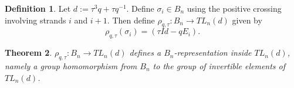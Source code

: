 \documentclass{amsart}
\newcommand{\hackcenter}[1]{
 \xy (0,0)*{#1}; \endxy}
\theoremstyle{plain}
\newtheorem{theorem}{Theorem}
\theoremstyle{definition}
\newtheorem{definition}[theorem]{Definition}
\theoremstyle{definition}
\numberwithin{equation}{section}
\numberwithin{theorem}{section}
\renewcommand{\to}{\rightarrow}
\numberwithin{equation}{section}
\def\ME#1{\textcolor[rgb]{0.40,0.00,0.90}{[ME: #1]}}%
\begin{document}

\begin{definition}
  Let $d:=\tau^3 q+\tau q^{-1}$. Define $\sigma_i\in B_n$ using the positive crossing involving strands $i$ and $i+1$.
  Then define $\rho_{q,\tau}:B_n \to TL_n(d)$ given by
  \[
  \rho_{q,\tau}(\sigma_i)=(\tau Id -q E_i).
  \]
\end{definition}
\begin{theorem}
  $\rho_{q,\tau}:B_n \to TL_n(d)$ defines a $B_n$-representation inside $TL_n(d)$, namely a group homomorphism from $B_n$ to the group of invertible elements of $TL_n(d)$.
\end{theorem}

\end{document}
